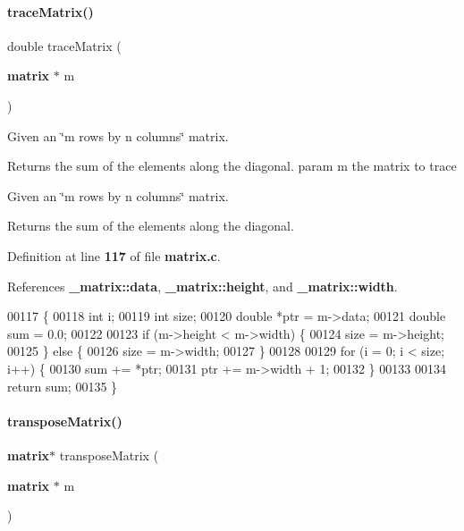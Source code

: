 \paragraph{trace\+Matrix()}
{\footnotesize\ttfamily double trace\+Matrix (\begin{DoxyParamCaption}\item[{\textbf{ matrix} $\ast$}]{m }\end{DoxyParamCaption})}



Given an \char`\"{}m rows by n columns\char`\"{} matrix. 

\begin{DoxyReturn}{Returns}
the sum of the elements along the diagonal. param m the matrix to trace
\end{DoxyReturn}
Given an \char`\"{}m rows by n columns\char`\"{} matrix.

\begin{DoxyReturn}{Returns}
the sum of the elements along the diagonal. 
\end{DoxyReturn}


Definition at line \textbf{ 117} of file \textbf{ matrix.\+c}.



References \textbf{ \+\_\+matrix\+::data}, \textbf{ \+\_\+matrix\+::height}, and \textbf{ \+\_\+matrix\+::width}.


\begin{DoxyCode}
00117                               \{
00118   \textcolor{keywordtype}{int} i;
00119   \textcolor{keywordtype}{int} size;
00120   \textcolor{keywordtype}{double} *ptr = m->data;
00121   \textcolor{keywordtype}{double} sum = 0.0;
00122 
00123   \textcolor{keywordflow}{if} (m->height < m->width) \{
00124     size = m->height;
00125   \} \textcolor{keywordflow}{else} \{
00126     size = m->width;
00127   \}
00128 
00129   \textcolor{keywordflow}{for} (i = 0; i < size; i++) \{
00130     sum += *ptr;
00131     ptr += m->width + 1;
00132   \}
00133 
00134   \textcolor{keywordflow}{return} sum;
00135 \}
\end{DoxyCode}
\mbox{\label{matrix_8h_a2936260302742748b0639e8ec71d4d9f}} 
\paragraph{transpose\+Matrix()}
{\footnotesize\ttfamily \textbf{ matrix}$\ast$ transpose\+Matrix (\begin{DoxyParamCaption}\item[{\textbf{ matrix} $\ast$}]{m }\end{DoxyParamCaption})}



